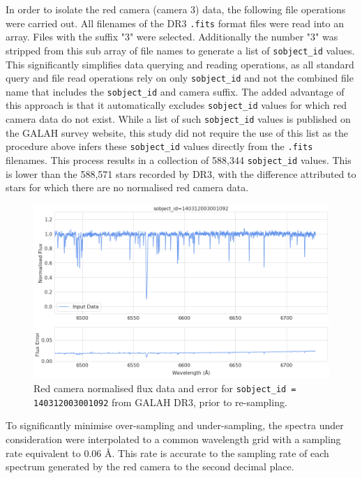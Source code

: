 In order to isolate the red camera (camera 3) data, the following file operations were carried out. All filenames of the DR3 \texttt{.fits} format files were read into an array. Files with the suffix "3" were selected. Additionally the number "3" was stripped from this sub array of file names to generate a list of \texttt{sobject\_id} values. This significantly simplifies data querying and reading operations, as all standard query and file read operations rely on only \texttt{sobject\_id} and not the combined file name that includes the \texttt{sobject\_id} and camera suffix. The added advantage of this approach is that it automatically excludes \texttt{sobject\_id} values for which red camera data do not exist. While a list of such \texttt{sobject\_id} values is published on the GALAH survey website, this study did not require the use of this list as the procedure above infers these \texttt{sobject\_id} values directly from the \texttt{.fits} filenames. This process results in a collection of 588,344 \texttt{sobject\_id} values. This is lower than the 588,571 stars recorded by DR3, with the difference attributed to stars for which there are no normalised red camera data. 

\begin{figure}[!htb]
\centering
\includegraphics[scale=.45]{figures/input spectrum.png}
\caption{Red camera normalised flux data and error for \texttt{sobject\_id = 140312003001092} from GALAH DR3, prior to re-sampling.}
\end{figure}

To significantly minimise over-sampling and under-sampling, the spectra under consideration were interpolated to a common wavelength grid with a sampling rate equivalent to 0.06 \r{A}. This rate is accurate to the sampling rate of each spectrum generated by the red camera to the second decimal place.

